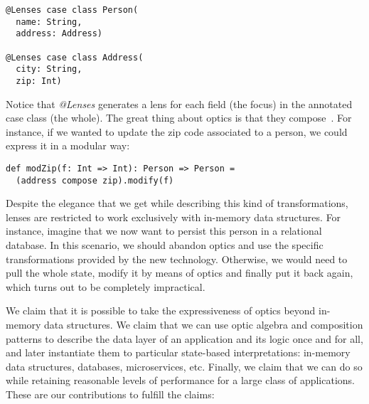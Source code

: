 \documentclass[final, twocolumn, 3p]{elsarticle}
\begin{document}
\begin{lstlisting}
@Lenses case class Person(
  name: String,
  address: Address)

@Lenses case class Address(
  city: String,
  zip: Int)
\end{lstlisting}

Notice that \emph{@Lenses} generates a lens for each field (the focus) in the
annotated case class (the whole). The great thing about optics is that they
compose~\cite{pickering2017profunctor}. For instance, if we wanted to update the
zip code associated to a person, we could express it in a modular way:

\begin{lstlisting}
def modZip(f: Int => Int): Person => Person =
  (address compose zip).modify(f)
\end{lstlisting}

Despite the elegance that we get while describing this kind of transformations,
lenses are restricted to work exclusively with in-memory data structures. For
instance, imagine that we now want to persist this person in a relational
database. In this scenario, we should abandon optics and use the specific
transformations provided by the new technology. Otherwise, we would need to pull
the whole state, modify it by means of optics and finally put it back again,
which turns out to be completely impractical.

We claim that it is possible to take the expressiveness of optics beyond
in-memory data structures. We claim that we can use optic algebra and
composition patterns to describe the data layer of an application and its logic
once and for all, and later instantiate them to particular state-based
interpretations: in-memory data structures, databases, microservices, etc.
Finally, we claim that we can do so while retaining reasonable levels of
performance for a large class of applications. These are our contributions to
fulfill the claims:
\end{document}
